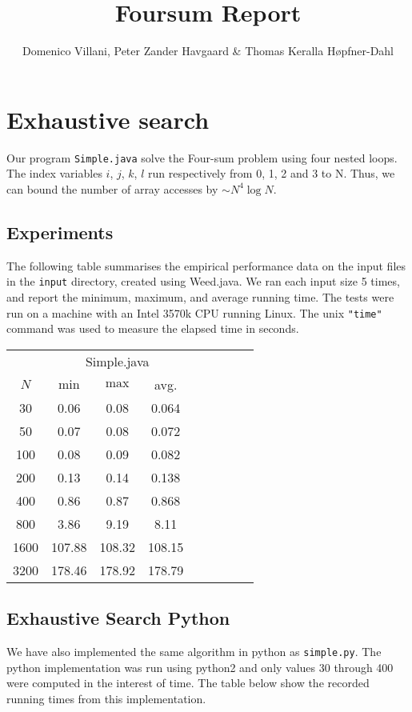 \documentclass{tufte-handout}
\title{Foursum Report}
\author{Domenico Villani, Peter Zander Havgaard \& Thomas Keralla Høpfner-Dahl}
\begin{document}
\maketitle
\thispagestyle{empty}

\section{Exhaustive search}


Our program \texttt{Simple.java} solve the Four-sum problem using four nested loops.
The index variables $i$, $j$, $k$, $l$ run respectively from 0, 1, 2 and 3 to N.
Thus, we can bound the number of array accesses by $\sim N^4\log N$.


\subsection{Experiments}
The following table summarises the empirical performance data on the input files in the \texttt{input} directory, created using Weed.java.
We ran each input size 5 times, and report the minimum, maximum, and average running time.
The tests were run on a machine with an Intel 3570k CPU running Linux. The unix \texttt{"time"} command was used to measure the elapsed time in seconds.

\bigskip\noindent
{ \small
  \begin{tabular}{cccccccc}
  \toprule
& \multicolumn{3}{c}{Simple.java} & $\quad$    \\\cmidrule{2-4} \cmidrule{6-8}
  $N$     & $\min$     & $\max$ & avg.  \\\midrule
  30 & 0.06 & 0.08 & 0.064 \\
  50 & 0.07 & 0.08 & 0.072 \\
  100 & 0.08 & 0.09 & 0.082 \\
  200 & 0.13 & 0.14 & 0.138 \\
  400 & 0.86 & 0.87 & 0.868 \\
  800 & 3.86 & 9.19 & 8.11 \\
  1600 & 107.88 & 108.32 & 108.15 \\
  3200 & 178.46 & 178.92 & 178.79 \\
  \bottomrule
  \end{tabular}
}

\newpage

\subsection{Exhaustive Search Python}
We have also implemented the same algorithm in python as \texttt{simple.py}. The python implementation was run using python2 and only values 30 through 400 were computed in the interest of time. The table below show the recorded running times from this implementation.
\end{document}
